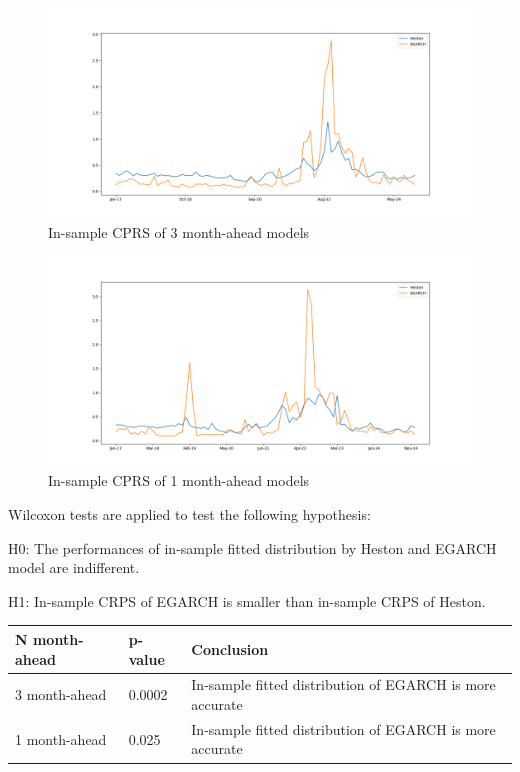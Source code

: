 \documentclass[12pt,a4paper]{article}
\numberwithin{equation}{section}
\begin{document}
\begin{figure}[h!] 
\includegraphics[scale=1,width=1\linewidth,height=0.4\textheight]{insample_crps_3m.png}
\caption{In-sample CPRS of 3 month-ahead models}
\label{3M_in}
\end{figure}

\begin{figure}[h!] 
\includegraphics[scale=1,width=1\linewidth,height=0.4\textheight]{insample_crps_1m.png}
\caption{In-sample CPRS of 1 month-ahead models}
\label{3M_in}
\end{figure}

Wilcoxon tests are applied to test the following hypothesis:

H0: The performances of in-sample fitted distribution by Heston and EGARCH model are indifferent.

H1:  In-sample CRPS of EGARCH is smaller than in-sample CRPS of Heston.

\begin{table}[h!]
\centering
\begin{tabular}{@{}lll@{}}
\toprule
N month-ahead     & p-value & Conclusion                     \\ \midrule
3 month-ahead     & 0.0002  & In-sample fitted distribution of EGARCH is more accurate \\
1 month-ahead     & 0.025    & In-sample fitted distribution of EGARCH is more accurate \\ \bottomrule
\end{tabular}
\end{table}
\end{document}

